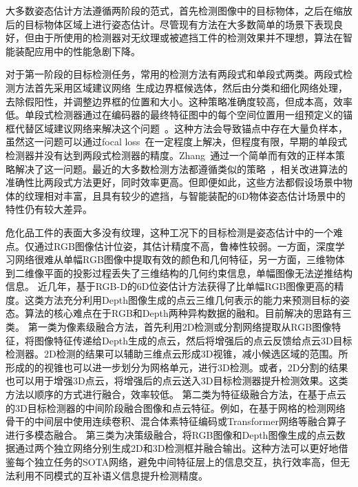 \documentclass[12pt]{article}
\begin{document}
大多数姿态估计方法遵循两阶段的范式，首先检测图像中的目标物体，之后在缩放后的目标物体区域上进行姿态估计。尽管现有方法在大多数简单的场景下表现良好，但由于所使用的检测器对无纹理或被遮挡工件的检测效果并不理想，算法在智能装配应用中的性能急剧下降。

对于第一阶段的目标检测任务，常用的检测方法有两段式和单段式两类\cite{ATSS, fcosv1, fcosv2, PAA, faster-rcnn, maskrcnn}。两段式检测方法首先采用区域建议网络~\cite{faster-rcnn, maskrcnn}生成边界框候选体，然后由分类和细化网络处理，去除假阳性，并调整边界框的位置和大小。这种策略准确度较高，但成本高，效率低。单段式检测器通过在编码器的最终特征图中的每个空间位置用一组预定义的锚框代替区域建议网络来解决这个问题~\cite{retinanet,fcosv1,yolov1}。这种方法会导致锚点中存在大量负样本，虽然这一问题可以通过focal loss~\cite{retinanet,fpn}在一定程度上解决，但程度有限，早期的单段式检测器并没有达到两段式检测器的精度。Zhang~\cite{ATSS}通过一个简单而有效的正样本策略解决了这一问题。最近的大多数检测方法都遵循类似的策略~\cite{fcosv2, PAA, autoassign, OTA, TTF, yolov3}，相关改进算法的准确性比两段式方法更好，同时效率更高。但即便如此，这些方法都假设场景中物体的纹理相对丰富，且具有较少的遮挡，与智能装配的6D物体姿态估计场景中的特性仍有较大差异。

危化品工件的表面大多没有纹理，这种工况下的目标检测是姿态估计中的一个难点。仅通过RGB图像估计位姿，其估计精度不高，鲁棒性较弱。一方面，深度学习网络很难从单幅RGB图像中提取有效的颜色和几何特征，另一方面，三维物体到二维像平面的投影过程丢失了三维结构的几何约束信息，单幅图像无法逆推结构信息。
近几年，基于RGB-D的6D位姿估计方法获得了比单幅RGB图像更高的精度。这类方法充分利用Depth图像生成的点云三维几何表示的能力来预测目标的姿态。算法的核心难点在于RGB和Depth两种异构数据的融和。目前解决的思路有三类。
第一类为像素级融合方法，首先利用2D检测或分割网络提取从RGB图像特征，将图像特征传递给Depth生成的点云，然后将增强后的点云反馈给点云3D目标检测器。2D检测的结果可以辅助三维点云形成3D视锥\cite{Qi2018}，减小候选区域的范围。所形成的的视锥也可以进一步划分为网格单元\cite{Wang2019}，进行3D检测。或者，2D分割的结果也可以用于增强3D点云\cite{Vora2020}，将增强后的点云送入3D目标检测器提升检测效果。这类方法以顺序的方式进行融合，效率较低。
第二类为特征级融合方法，在基于点云的3D目标检测器的中间阶段融合图像和点云特征。例如，在基于网格的检测网络骨干的中间层中使用连续卷积\cite{Liang2018, Liang2019}、混合体素特征编码\cite{Sindagi2019}或Transformer\cite{Zhang2022}网络等融合算子进行多模态融合。
第三类为决策级融合，将RGB图像和Depth图像生成的点云数据通过两个独立网络分别生成2D和3D检测框\cite{Asvadi2018}并融合输出。这种方法可以更好地借鉴每个独立任务的SOTA网络，避免中间特征层上的信息交互，执行效率高，但无法利用不同模式的互补语义信息\cite{Pang2020}提升检测精度。
\end{document}
